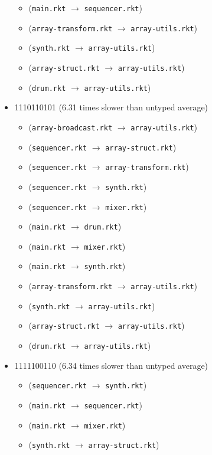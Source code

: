 \documentclass{article}
\newcommand{\mono}[1]{\texttt{#1}}
\begin{document}
\begin{itemize}
\begin{itemize}
  \item (\mono{main.rkt} $\rightarrow$ \mono{sequencer.rkt})
  \item (\mono{array-transform.rkt} $\rightarrow$ \mono{array-utils.rkt})
  \item (\mono{synth.rkt} $\rightarrow$ \mono{array-utils.rkt})
  \item (\mono{array-struct.rkt} $\rightarrow$ \mono{array-utils.rkt})
  \item (\mono{drum.rkt} $\rightarrow$ \mono{array-utils.rkt})
  \end{itemize}
\item 1110110101 (6.31 times slower than untyped average)
  \begin{itemize}
  \item (\mono{array-broadcast.rkt} $\rightarrow$ \mono{array-utils.rkt})
  \item (\mono{sequencer.rkt} $\rightarrow$ \mono{array-struct.rkt})
  \item (\mono{sequencer.rkt} $\rightarrow$ \mono{array-transform.rkt})
  \item (\mono{sequencer.rkt} $\rightarrow$ \mono{synth.rkt})
  \item (\mono{sequencer.rkt} $\rightarrow$ \mono{mixer.rkt})
  \item (\mono{main.rkt} $\rightarrow$ \mono{drum.rkt})
  \item (\mono{main.rkt} $\rightarrow$ \mono{mixer.rkt})
  \item (\mono{main.rkt} $\rightarrow$ \mono{synth.rkt})
  \item (\mono{array-transform.rkt} $\rightarrow$ \mono{array-utils.rkt})
  \item (\mono{synth.rkt} $\rightarrow$ \mono{array-utils.rkt})
  \item (\mono{array-struct.rkt} $\rightarrow$ \mono{array-utils.rkt})
  \item (\mono{drum.rkt} $\rightarrow$ \mono{array-utils.rkt})
  \end{itemize}
\item 1111100110 (6.34 times slower than untyped average)
  \begin{itemize}
  \item (\mono{sequencer.rkt} $\rightarrow$ \mono{synth.rkt})
  \item (\mono{main.rkt} $\rightarrow$ \mono{sequencer.rkt})
  \item (\mono{main.rkt} $\rightarrow$ \mono{mixer.rkt})
  \item (\mono{synth.rkt} $\rightarrow$ \mono{array-struct.rkt})

\end{itemize}
\end{itemize}
\end{document}
